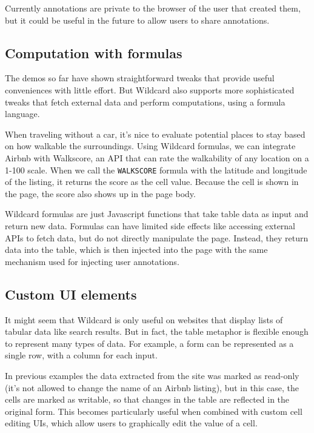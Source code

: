 \documentclass[english,submission]{programming}
\begin{document}
Currently annotations are private to the browser of the user that
created them, but it could be useful in the future to allow users to
share annotations.

\hypertarget{computation-with-formulas}{%
\subsection{Computation with formulas}\label{computation-with-formulas}}

The demos so far have shown straightforward tweaks that provide useful
conveniences with little effort. But Wildcard also supports more
sophisticated tweaks that fetch external data and perform computations,
using a formula language.

When traveling without a car, it's nice to evaluate potential places to
stay based on how walkable the surroundings. Using Wildcard formulas, we
can integrate Airbnb with Walkscore, an API that can rate the
walkability of any location on a 1-100 scale. When we call the
\texttt{WALKSCORE} formula with the latitude and longitude of the
listing, it returns the score as the cell value. Because the cell is
shown in the page, the score also shows up in the page body.

Wildcard formulas are just Javascript functions that take table data as
input and return new data. Formulas can have limited side effects like
accessing external APIs to fetch data, but do not directly manipulate
the page. Instead, they return data into the table, which is then
injected into the page with the same mechanism used for injecting user
annotations.

\hypertarget{custom-ui-elements}{%
\subsection{Custom UI elements}\label{custom-ui-elements}}

It might seem that Wildcard is only useful on websites that display
lists of tabular data like search results. But in fact, the table
metaphor is flexible enough to represent many types of data. For
example, a form can be represented as a single row, with a column for
each input.

In previous examples the data extracted from the site was marked as
read-only (it's not allowed to change the name of an Airbnb listing),
but in this case, the cells are marked as writable, so that changes in
the table are reflected in the original form. This becomes particularly
useful when combined with custom cell editing UIs, which allow users to
graphically edit the value of a cell.
\end{document}
